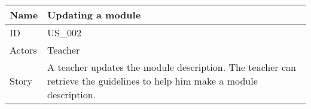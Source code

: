 \documentclass{article}
\newcommand\addrow[2]{#1 &#2\\ }
\newcommand\tabularhead{\begin{tabular}{lp{8cm}}
		\hline
	}
\newenvironment{usecase}{\tabularhead}
	{\hline\end{tabular}}
\begin{document}
	\begin{usecase}
		\addrow{Name}{Updating a module}
		\hline
		\addrow{ID}{US\_002}
		\hline
 		\addrow{Actors}{ Teacher  }
		\hline		
		\addrow{Story}{A teacher updates the module description. The teacher can retrieve the guidelines to help him make a module description. }
								

	\end{usecase}
	
\end{document}
